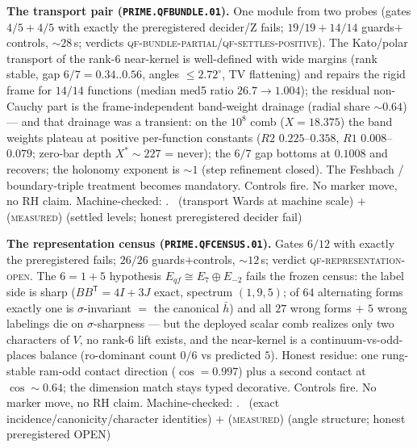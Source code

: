 \par\smallskip\noindent\textbf{The transport pair
(\texttt{PRIME.QFBUNDLE.01}).}
One module from two probes (gates $4/5+4/5$ with exactly the
preregistered decider/Z fails; $19/19+14/14$ guards$+$controls,
${\sim}28$\,s; verdicts
\textsc{qf-bundle-partial}/\textsc{qf-settles-positive}).  The
Kato/polar transport of the rank-6 near-kernel is well-defined
with wide margins (rank stable, gap $6/7 = 0.34$..$0.56$, angles
$\le2.72^{\circ}$, TV flattening) and repairs the rigid frame for
$14/14$ functions (median med5 ratio $26.7\to1.004$); the residual
non-Cauchy part is the frame-independent band-weight drainage
(radial share ${\sim}0.64$) --- and that drainage was a transient:
on the $10^{8}$ comb ($X=18.375$) the band weights plateau at
positive per-function constants ($R2$ $0.225$--$0.358$, $R1$
$0.008$--$0.079$; zero-bar depth $X^{*}\sim227$ = never); the
$6/7$ gap bottoms at $0.1008$ and recovers; the holonomy exponent
is ${\sim}1$ (step refinement closed).  The Feshbach /
boundary-triple treatment becomes mandatory.  Controls fire.
No marker move, no RH claim.
Machine-checked: .
\mE\ (transport Wards at machine scale) $+$ (\textsc{measured})
(settled levels; honest preregistered decider fail)
\par\smallskip


\par\smallskip\noindent\textbf{The representation census
(\texttt{PRIME.QFCENSUS.01}).}
Gates $6/12$ with exactly the preregistered fails; $26/26$
guards$+$controls, ${\sim}12$\,s; verdict
\textsc{qf-representation-open}.  The $6=1{+}5$ hypothesis
$E_{qf}\cong E_{7}\oplus E_{-2}$ fails the frozen census: the
label side is sharp ($BB^{\mathsf T}=4I+3J$ exact, spectrum
$(1,9,5)$; of $64$ alternating forms exactly one is
$\sigma$-invariant $=$ the canonical $\bar h$) and all $27$ wrong
forms $+$ $5$ wrong labelings die on $\sigma$-sharpness --- but
the deployed scalar comb realizes only two characters of $V$, no
rank-6 lift exists, and the near-kernel is a
continuum-vs-odd-places balance (ro-dominant count $0/6$ vs
predicted $5$).  Honest residue: one rung-stable ram-odd contact
direction ($\cos=0.997$) plus a second contact at $\cos\sim0.64$;
the dimension match stays typed decorative.  Controls fire.
No marker move, no RH claim.
Machine-checked: .
\mE\ (exact incidence/canonicity/character identities) $+$
(\textsc{measured}) (angle structure; honest preregistered OPEN)
\par\smallskip


